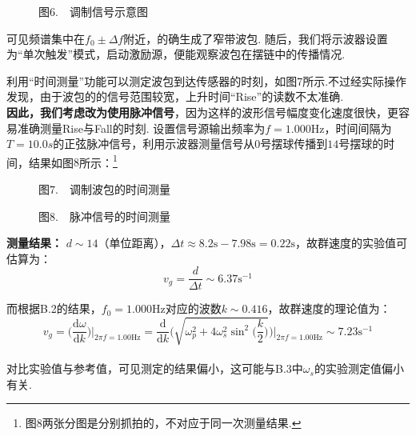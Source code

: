 \documentclass{ctexart}
\begin{document}
\begin{figure}[htbp]
  \centering
   \qquad
   \caption*{图$6.\quad$调制信号示意图}
  \end{figure}

可见频谱集中在$f_0\pm \Delta f$附近，的确生成了窄带波包. 随后，我们将示波器设置为“单次触发”模式，启动激励源，便能观察波包在摆链中的传播情况.

利用“时间测量”功能可以测定波包到达传感器的时刻，如图7所示.不过经实际操作发现，由于波包的的信号范围较宽，上升时间“Rise”的读数不太准确.\\

\textbf{因此，我们考虑改为使用脉冲信号}，因为这样的波形信号幅度变化速度很快，更容易准确测量Rise与Fall的时刻. 设置信号源输出频率为$f=1.000\mathrm{Hz}$，时间间隔为$T=10.0s$的正弦脉冲信号，利用示波器测量信号从$0$号摆球传播到$14$号摆球的时间，结果如图$8$所示：\footnote{图$8$两张分图是分别抓拍的，不对应于同一次测量结果.}\\

\clearpage

\begin{figure}[htbp]
  \centering
   \qquad
   \caption*{图$7.\quad$调制波包的时间测量}
  \end{figure}

  \begin{figure}[!htbp]
    \centering
     \qquad
\caption*{图$8.\quad$脉冲信号的时间测量}
    \end{figure}

\noindent \textbf{测量结果：} $d\sim 14$（单位距离），$\Delta t\approx 8.2\mathrm{s}-7.98\mathrm{s}=0.22\mathrm{s}$，故群速度的实验值可估算为：
    \begin{equation*}
      v_g=\frac{d}{\Delta t}\sim 6.37\mathrm{s^{-1}}
    \end{equation*}

\noindent 而根据B.2的结果，$f_0=1.000\mathrm{Hz}$对应的波数$k\sim0.416$，故群速度的理论值为：
\begin{equation*}
  v_g=\displaystyle\Big(\frac{\mathrm{d}\omega}{\mathrm{d}k}\Big)\Big|_{2\pi f=1.00\mathrm{Hz}}=\frac{\mathrm{d}}{\mathrm{d}k}\Big(\sqrt{\omega_p^2+4\omega_s^2\sin^2\Big(\frac{k}{2}\Big)}\Big)\Big|_{2\pi f=1.00\mathrm{Hz}}\sim 7.23\mathrm{s^{-1}}
\end{equation*}
\\
\noindent 对比实验值与参考值，可见测定的结果偏小，这可能与B.3中$\omega_s$的实验测定值偏小有关.\\
\end{document}
